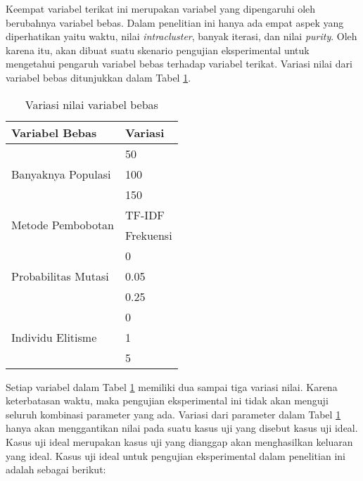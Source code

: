 Keempat variabel terikat ini merupakan variabel yang dipengaruhi oleh berubahnya variabel bebas. Dalam penelitian ini hanya ada empat aspek yang diperhatikan yaitu waktu, nilai \textit{intracluster}, banyak iterasi, dan nilai \textit{purity}. Oleh karena itu, akan dibuat suatu skenario pengujian eksperimental untuk mengetahui pengaruh variabel bebas terhadap variabel terikat. Variasi nilai dari variabel bebas ditunjukkan dalam Tabel \ref{tbl:testScenario}.

\begin{table}[H]
	\centering
	\begin{tabular}{|l|l|}
		\hline
		Variabel Bebas                       & Variasi   \\ \hline
		\multirow{3}{*}{Banyaknya Populasi}  & 50        \\ \cline{2-2} 
		                                     & 100       \\ \cline{2-2} 
		                                     & 150       \\ \hline
		\multirow{2}{*}{Metode Pembobotan}   & TF-IDF    \\ \cline{2-2} 
		                                     & Frekuensi \\ \hline
		\multirow{3}{*}{Probabilitas Mutasi} & 0         \\ \cline{2-2} 
		                                     & 0.05      \\ \cline{2-2} 
		                                     & 0.25      \\ \hline
		\multirow{3}{*}{Individu Elitisme}   & 0         \\ \cline{2-2} 
 		                                     & 1         \\ \cline{2-2} 
		                                     & 5         \\ \hline
\end{tabular}
	\caption{Variasi nilai variabel bebas}
	\label{tbl:testScenario}
\end{table}

Setiap variabel dalam Tabel \ref{tbl:testScenario} memiliki dua sampai tiga variasi nilai. Karena keterbatasan waktu, maka pengujian eksperimental ini tidak akan menguji seluruh kombinasi parameter yang ada. Variasi dari parameter dalam Tabel \ref{tbl:testScenario} hanya akan menggantikan nilai pada suatu kasus uji yang disebut kasus uji ideal. Kasus uji ideal merupakan kasus uji yang dianggap akan menghasilkan keluaran yang ideal. Kasus uji ideal untuk pengujian eksperimental dalam penelitian ini adalah sebagai berikut:

